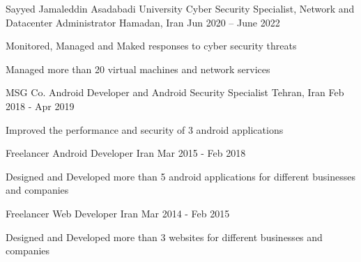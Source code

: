 

\begin{cventries}

    \cventry
        {Sayyed Jamaleddin Asadabadi University}
        {Cyber Security Specialist, Network and Datacenter Administrator}
        {Hamadan, Iran}
        {Jun 2020 – June 2022}
        {
            \begin{cvitems} 
                \item {Monitored, Managed and Maked responses to cyber security threats}
                \item {Managed more than 20 virtual machines and network services}
            \end{cvitems}
        }

    \cventry
        {MSG Co.}
        {Android Developer and Android Security Specialist}
        {Tehran, Iran}
        {Feb 2018 - Apr 2019}
        {
            \begin{cvitems} 
                \item {Improved the performance and security of 3 android applications}
            \end{cvitems}
        }

    \cventry
        {Freelancer} 
        {Android Developer}
        {Iran} 
        {Mar 2015 - Feb 2018} 
        {
            \begin{cvitems} 
                \item {Designed and Developed more than 5 android applications for different businesses and companies}
            \end{cvitems}
        }
    
    \cventry
        {Freelancer} 
        {Web Developer} 
        {Iran} 
        {Mar 2014 - Feb 2015} 
        {
            \begin{cvitems} 
                \item {Designed and Developed more than 3 websites for different businesses and companies} 
            \end{cvitems} 
        }
\end{cventries}